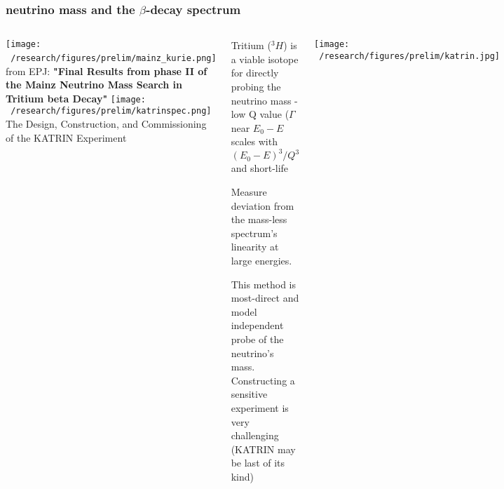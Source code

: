 \documentclass{beamer}
\begin{document}
	\begin{frame}
		\frametitle{neutrino mass and the $\beta$-decay spectrum}
		\begin{columns}[c] %
			
			\texttt{[image: ~/research/figures/prelim/mainz\_kurie.png]}
			{\fontsize{3}{10} \selectfont \\ from EPJ: \textbf{"Final Results from phase II of the Mainz Neutrino Mass Search
in Tritium beta Decay"}}
			\vspace{50pt}
			\texttt{[image: ~/research/figures/prelim/katrinspec.png]}
			{\fontsize{3}{10} \selectfont The Design, Construction, and Commissioning of the
KATRIN Experiment}

			
			\begin{itemize}{\tiny
				\item Tritium ($^3H$) is a viable isotope for directly probing the neutrino mass - low Q value ($\Gamma$ near $E_0 - E$ scales with $(E_0-E)^3 / Q^3$  and short-life
				\item Measure deviation from the mass-less spectrum's linearity at large energies.
				\item This method is most-direct and model independent probe of the neutrino's mass. Constructing a sensitive experiment is very challenging (KATRIN may be last of its kind)}
			\end{itemize}
			
			\texttt{[image: ~/research/figures/prelim/katrin.jpg]}
			
			
		\end{columns}
	\end{frame}
	
\end{document}
